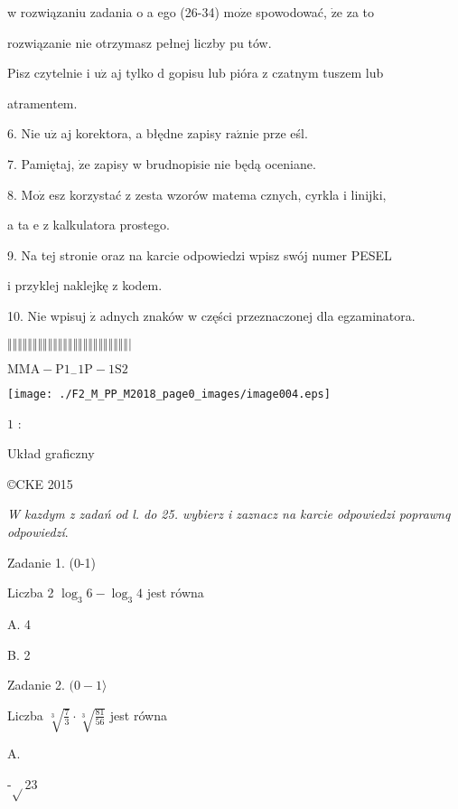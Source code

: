 \documentclass[a4paper,12pt]{article}
\begin{document}
w rozwiązaniu zadania o a ego (26-34) $\mathrm{m}\mathrm{o}\dot{\mathrm{z}}\mathrm{e}$ spowodować, $\dot{\mathrm{z}}\mathrm{e}$ za to

rozwiązanie nie otrzymasz pełnej liczby pu tów.

Pisz czytelnie i $\mathrm{u}\dot{\mathrm{z}}$ aj tylko $\mathrm{d}$ gopisu lub pióra z czatnym tuszem lub

atramentem.

6. Nie $\mathrm{u}\dot{\mathrm{z}}$ aj korektora, a błędne zapisy $\mathrm{r}\mathrm{a}\acute{\mathrm{z}}\mathrm{n}\mathrm{i}\mathrm{e}$ prze eśl.

7. Pamiętaj, $\dot{\mathrm{z}}\mathrm{e}$ zapisy w brudnopisie nie będą oceniane.

8. $\mathrm{M}\mathrm{o}\dot{\mathrm{z}}$ esz korzystać z zesta wzorów matema cznych, cyrkla i linijki,

a ta $\mathrm{e}$ z kalkulatora prostego.

9. Na tej stronie oraz na karcie odpowiedzi wpisz swój numer PESEL

i przyklej naklejkę z kodem.

10. Nie wpisuj $\dot{\mathrm{z}}$ adnych znaków w części przeznaczonej dla egzaminatora.

$\Vert\Vert\Vert\Vert\Vert\Vert\Vert\Vert\Vert\Vert\Vert\Vert\Vert\Vert\Vert\Vert\Vert\Vert\Vert\Vert\Vert\Vert\Vert\Vert|$

$\mathrm{M}\mathrm{M}\mathrm{A}-\mathrm{P}1_{-}1\mathrm{P}-1\mathrm{S}2$
\begin{center}
\texttt{[image: ./F2\_M\_PP\_M2018\_page0\_images/image004.eps]}
\end{center}
$1$ :

Układ graficzny

\copyright CKE 2015




{\it W kazdym z zadań od l. do 25. wybierz i zaznacz na karcie odpowiedzi poprawnq odpowiedzí}.

Zadanie 1. (0-1)

Liczba 2 $\log_{3}6-\log_{3}4$ jest równa

A. 4

B. 2

Zadanie 2. $(0-1\rangle$

Liczba $\sqrt[3]{\frac{7}{3}}\cdot\sqrt[3]{\frac{81}{56}}$ jest równa

A.

-$\sqrt{}$23
\end{document}
